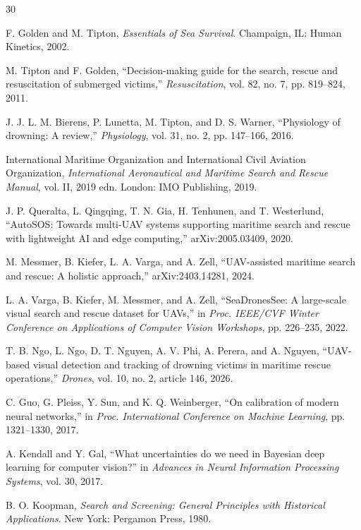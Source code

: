 \documentclass[runningheads]{llncs}
\begin{document}
\begin{thebibliography}{30}

F. Golden and M. Tipton, \textit{Essentials of Sea Survival}. Champaign, IL: Human Kinetics, 2002.

M. Tipton and F. Golden, ``Decision-making guide for the search, rescue and resuscitation of submerged victims,'' \textit{Resuscitation}, vol. 82, no. 7, pp. 819--824, 2011.

J. J. L. M. Bierens, P. Lunetta, M. Tipton, and D. S. Warner, ``Physiology of drowning: A review,'' \textit{Physiology}, vol. 31, no. 2, pp. 147--166, 2016.

International Maritime Organization and International Civil Aviation Organization, \textit{International Aeronautical and Maritime Search and Rescue Manual}, vol. II, 2019 edn. London: IMO Publishing, 2019.

J. P. Queralta, L. Qingqing, T. N. Gia, H. Tenhunen, and T. Westerlund, ``AutoSOS: Towards multi-UAV systems supporting maritime search and rescue with lightweight AI and edge computing,'' arXiv:2005.03409, 2020.

M. Messmer, B. Kiefer, L. A. Varga, and A. Zell, ``UAV-assisted maritime search and rescue: A holistic approach,'' arXiv:2403.14281, 2024.

L. A. Varga, B. Kiefer, M. Messmer, and A. Zell, ``SeaDronesSee: A large-scale visual search and rescue dataset for UAVs,'' in \textit{Proc. IEEE/CVF Winter Conference on Applications of Computer Vision Workshops}, pp. 226--235, 2022.

T. B. Ngo, L. Ngo, D. T. Nguyen, A. V. Phi, A. Perera, and A. Nguyen, ``UAV-based visual detection and tracking of drowning victims in maritime rescue operations,'' \textit{Drones}, vol. 10, no. 2, article 146, 2026.

C. Guo, G. Pleiss, Y. Sun, and K. Q. Weinberger, ``On calibration of modern neural networks,'' in \textit{Proc. International Conference on Machine Learning}, pp. 1321--1330, 2017.

A. Kendall and Y. Gal, ``What uncertainties do we need in Bayesian deep learning for computer vision?'' in \textit{Advances in Neural Information Processing Systems}, vol. 30, 2017.

B. O. Koopman, \textit{Search and Screening: General Principles with Historical Applications}. New York: Pergamon Press, 1980.


\end{thebibliography}
\end{document}
